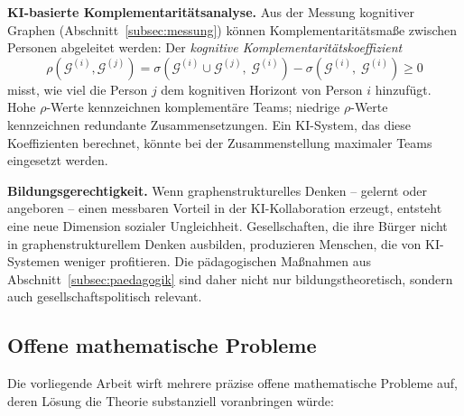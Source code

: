 ﻿\documentclass[12pt,a4paper]{article}
\theoremstyle{plain}
\theoremstyle{definition}
\theoremstyle{remark}
\newcommand{\GG}{\mathcal{G}}
\begin{document}
\textbf{KI-basierte Komplementaritätsanalyse.} Aus der Messung kognitiver Graphen (Abschnitt~\ref{subsec:messung}) können Komplementaritätsmaße zwischen Personen abgeleitet werden: Der \emph{kognitive Komplementaritätskoeffizient}
\[
  \rho(\GG^{(i)}, \GG^{(j)}) = \sigma\!\left(\GG^{(i)} \cup \GG^{(j)},\; \GG^{(i)}\right) - \sigma\!\left(\GG^{(i)},\; \GG^{(i)}\right) \geq 0
\]
misst, wie viel die Person $j$ dem kognitiven Horizont von Person $i$ hinzufügt. Hohe $\rho$-Werte kennzeichnen komplementäre Teams; niedrige $\rho$-Werte kennzeichnen redundante Zusammensetzungen. Ein KI-System, das diese Koeffizienten berechnet, könnte bei der Zusammenstellung maximaler Teams eingesetzt werden.

\textbf{Bildungsgerechtigkeit.} Wenn graphenstrukturelles Denken -- gelernt oder angeboren -- einen messbaren Vorteil in der KI-Kollaboration erzeugt, entsteht eine neue Dimension sozialer Ungleichheit. Gesellschaften, die ihre Bürger nicht in graphenstrukturellem Denken ausbilden, produzieren Menschen, die von KI-Systemen weniger profitieren. Die pädagogischen Maßnahmen aus Abschnitt~\ref{subsec:paedagogik} sind daher nicht nur bildungstheoretisch, sondern auch gesellschaftspolitisch relevant.

\subsection{Offene mathematische Probleme}
\label{subsec:offen}

Die vorliegende Arbeit wirft mehrere präzise offene mathematische Probleme auf, deren Lösung die Theorie substanziell voranbringen würde:
\end{document}
